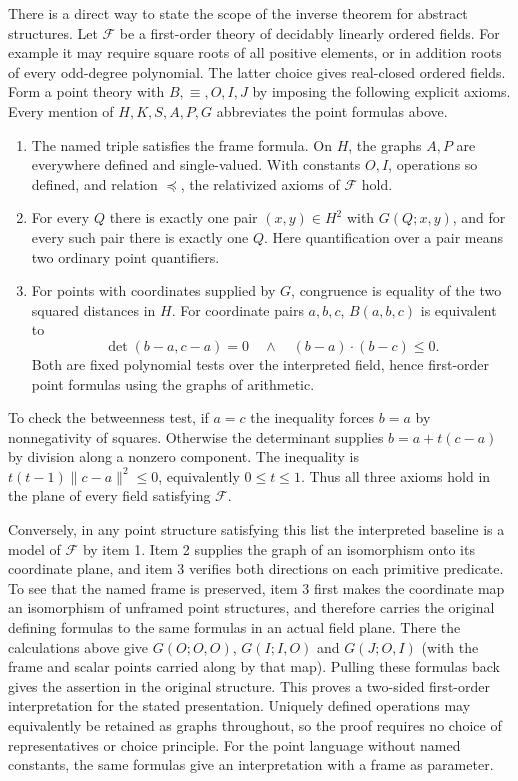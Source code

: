 There is a direct way to state the scope of the inverse theorem for
abstract structures. Let $\mathcal F$ be a first-order theory of
decidably linearly ordered fields. For example it may require square
roots of all positive elements, or in addition roots of every odd-degree
polynomial. The latter choice gives real-closed ordered fields. Form a
point theory with $B,\equiv,O,I,J$ by imposing the following explicit
axioms. Every mention of $H,K,S,A,P,G$ abbreviates the point formulas
above.
\begin{enumerate}
\item The named triple satisfies the frame formula. On $H$, the graphs
$A,P$ are everywhere defined and single-valued. With constants
$O,I$, operations so defined, and relation $\preceq$, the relativized
axioms of $\mathcal F$ hold.
\item For every $Q$ there is exactly one pair $(x,y)\in H^2$ with
$G(Q;x,y)$, and for every such pair there is exactly one $Q$.
Here quantification over a pair means two ordinary point quantifiers.
\item For points with coordinates supplied by $G$, congruence is equality
of the two squared distances in $H$. For coordinate pairs $a,b,c$,
$B(a,b,c)$ is equivalent to
\[
 \det(b-a,c-a)=0\quad\land\quad(b-a)\cdot(b-c)\le0 .
\]
Both are fixed polynomial tests over the interpreted field, hence
first-order point formulas using the graphs of arithmetic.
\end{enumerate}
To check the betweenness test, if $a=c$ the inequality forces $b=a$
by nonnegativity of squares. Otherwise the determinant supplies
$b=a+t(c-a)$ by division along a nonzero component. The inequality is
$t(t-1)\|c-a\|^2\le0$, equivalently $0\le t\le1$. Thus all three
axioms hold in the plane of every field satisfying $\mathcal F$.

Conversely, in any point structure satisfying this list the interpreted
baseline is a model of $\mathcal F$ by item 1. Item 2 supplies the graph
of an isomorphism onto its coordinate plane, and item 3 verifies both
directions on each primitive predicate. To see that the named frame is preserved,
item 3 first makes the coordinate map an isomorphism of unframed point
structures, and therefore carries the original defining formulas to the
same formulas in an actual field plane. There the calculations above
give $G(O;O,O)$, $G(I;I,O)$ and $G(J;O,I)$ (with the frame and scalar
points carried along by that map). Pulling these formulas back gives
the assertion in the original structure. This proves a two-sided
first-order interpretation for the stated presentation. Uniquely
defined operations may equivalently be retained as graphs throughout,
so the proof requires no choice of representatives or choice principle.
For the point language without named constants, the same formulas
give an interpretation with a frame as parameter.

